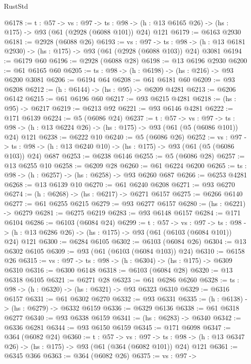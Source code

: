 \begin{lexlean}{RustStd}
\begin{coremodule}
@6178 := {t : @57} ->
  {vs : @97} ->
  {ts : @98} -> (h : @13 @6165 @26) -> (hs : @175) -> @93 (@61 (@2928 (@6088 @101)) @24) @121
@6179 := @6163 @2930
@6181 := @2928 (@6088 @26)
@6193 := {vs : @97} ->
  {ts : @98} -> (h : @13 @6181 @2930) -> (hs : @175) -> @93 (@61 (@2928 (@6088 @103)) @24) @3081
@6194 := @6179 @60
@6196 := @2928 (@6088 @28)
@6198 := @13 @6196 @2930
@6200 := @61 @6165 @60
@6205 := {ts : @98} -> (h : @6198) -> (hs : @216) -> @93 @6200 @3081
@6206 := @6194 @64
@6208 := @61 @6181 @60
@6209 := @93 @6208
@6212 := (h : @6144) -> (hs : @95) -> @6209 @4281
@6213 := @6206 @6142
@6215 := @61 @6196 @60
@6217 := @93 @6215 @4281
@6218 := (hs : @95) -> @6217
@6219 := @6213 @92
@6221 := @93 @6146 @4281
@6222 := @171 @6139
@6224 := @5 (@6086 @24)
@6237 := {t : @57} ->
  {vs : @97} ->
  {ts : @98} -> (h : @13 @6224 @26) -> (hs : @175) -> @93 (@61 (@5 (@6086 @101)) @24) @121
@6238 := @6222 @10
@6240 := @5 (@6086 @26)
@6252 := {vs : @97} ->
  {ts : @98} -> (h : @13 @6240 @10) -> (hs : @175) -> @93 (@61 (@5 (@6086 @103)) @24) @687
@6253 := @6238 @6146
@6255 := @5 (@6086 @28)
@6257 := @13 @6255 @10
@6258 := @6209 @28
@6260 := @61 @6224 @6200
@6265 := {ts : @98} -> (h : @6257) -> (hs : @6258) -> @93 @6260 @687
@6266 := @6253 @4281
@6268 := @13 @6139 @10
@6270 := @61 @6240 @6208
@6271 := @93 @6270
@6274 := (h : @6268) -> (hs : @6217) -> @6271 @6157
@6275 := @6266 @6140
@6277 := @61 @6255 @6215
@6279 := @93 @6277 @6157
@6280 := (hs : @6221) -> @6279
@6281 := @6275 @6219
@6283 := @93 @6148 @6157
@6284 := @171 @6104
@6286 := @6103 (@6084 @24)
@6299 := {t : @57} ->
  {vs : @97} ->
  {ts : @98} -> (h : @13 @6286 @26) -> (hs : @175) -> @93 (@61 (@6103 (@6084 @101)) @24) @121
@6300 := @6284 @6105
@6302 := @6103 (@6084 @26)
@6304 := @13 @6302 @6105
@6309 := @93 (@61 (@6103 (@6084 @103)) @24)
@6310 := @6158 @26
@6315 := {vs : @97} -> {ts : @98} -> (h : @6304) -> (hs : @175) -> @6309 @6310
@6316 := @6300 @6148
@6318 := @6103 (@6084 @28)
@6320 := @13 @6318 @6105
@6321 := @6271 @28
@6323 := @61 @6286 @6260
@6328 := {ts : @98} -> (h : @6320) -> (hs : @6321) -> @93 @6323 @6310
@6329 := @6316 @6157
@6331 := @61 @6302 @6270
@6332 := @93 @6331
@6335 := (h : @6138) -> (hs : @6279) -> @6332 @6159
@6336 := @6329 @6136
@6338 := @61 @6318 @6277
@6340 := @93 @6338 @6159
@6341 := (hs : @6283) -> @6340
@6342 := @6336 @6281
@6344 := @93 @6150 @6159
@6345 := @171 @6098
@6347 := @364 (@6082 @24)
@6360 := {t : @57} ->
  {vs : @97} ->
  {ts : @98} -> (h : @13 @6347 @26) -> (hs : @175) -> @93 (@61 (@364 (@6082 @101)) @24) @121
@6361 := @6345 @366
@6363 := @364 (@6082 @26)
@6375 := {vs : @97} ->

\end{coremodule}
\end{lexlean}
